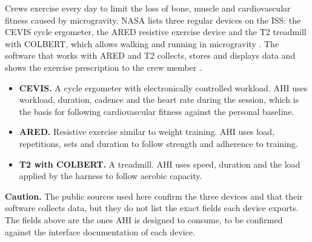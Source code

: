 Crews exercise every day to limit the loss of bone, muscle and cardiovascular fitness caused by microgravity. NASA lists three regular devices on the ISS: the CEVIS cycle ergometer, the ARED resistive exercise device and the T2 treadmill with COLBERT, which allows walking and running in microgravity \cite{nasa_jsc_exercise_countermeasures}. The software that works with ARED and T2 collects, stores and displays data and shows the exercise prescription to the crew member \cite{nasa_jsc_exercise_countermeasures}.

\begin{itemize}
\item \textbf{CEVIS.} A cycle ergometer with electronically controlled workload. AHI uses workload, duration, cadence and the heart rate during the session, which is the basis for following cardiovascular fitness against the personal baseline.
\item \textbf{ARED.} Resistive exercise similar to weight training. AHI uses load, repetitions, sets and duration to follow strength and adherence to training.
\item \textbf{T2 with COLBERT.} A treadmill. AHI uses speed, duration and the load applied by the harness to follow aerobic capacity.
\end{itemize}

\medskip\noindent\textbf{Caution.} The public sources used here confirm the three devices and that their software collects data, but they do not list the exact fields each device exports. The fields above are the ones AHI is designed to consume, to be confirmed against the interface documentation of each device.




